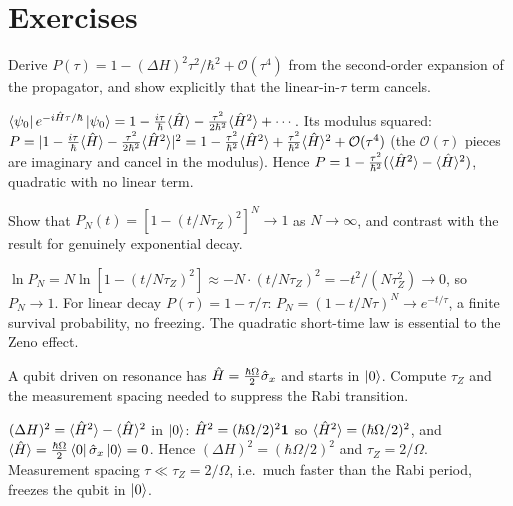 \section*{Exercises}

\begin{exercise}
Derive $P(\tau)=1-(\Delta H)^2\tau^2/\hbar^2+\mathcal O(\tau^4)$ from
the second-order expansion of the propagator, and show explicitly
that the linear-in-$\tau$ term cancels.
\begin{solution}
$\bra{\psi_0}e^{-i\hat{H}\tau/\hbar}\ket{\psi_0}
=1-\tfrac{i\tau}{\hbar}\langle\hat{H}\rangle-\tfrac{\tau^2}{2\hbar^2}\langle\hat{H}^2\rangle+\cdots$.
Its modulus squared:
$P=|1-\tfrac{i\tau}\hbar\langle\hat{H}\rangle-\tfrac{\tau^2}{2\hbar^2}\langle\hat{H}^2\rangle|^2
=1-\tfrac{\tau^2}{\hbar^2}\langle\hat{H}^2\rangle+\tfrac{\tau^2}{\hbar^2}\langle\hat{H}\rangle^2+\mathcal O(\tau^4)$
(the $\mathcal O(\tau)$ pieces are imaginary and cancel in the
modulus). Hence $P=1-\tfrac{\tau^2}{\hbar^2}(\langle\hat{H}^2\rangle-\langle\hat{H}\rangle^2)$,
quadratic with no linear term.
\end{solution}
\end{exercise}

\begin{exercise}
Show that $P_N(t)=[1-(t/N\tau_Z)^2]^N\to1$ as $N\to\infty$, and
contrast with the result for genuinely exponential decay.
\begin{solution}
$\ln P_N=N\ln[1-(t/N\tau_Z)^2]\approx -N\cdot(t/N\tau_Z)^2=-t^2/(N\tau_Z^2)\to0$,
so $P_N\to1$. For linear decay $P(\tau)=1-\tau/\tau$:
$P_N=(1-t/N\tau)^N\to e^{-t/\tau}$, a finite survival probability,
no freezing. The quadratic short-time law is essential to the Zeno
effect.
\end{solution}
\end{exercise}

\begin{exercise}
A qubit driven on resonance has $\hat{H}=\tfrac{\hbar\Omega}{2}\hat\sigma_x$
and starts in $\ket0$. Compute $\tau_Z$ and the measurement spacing
needed to suppress the Rabi transition.
\begin{solution}
$(\Delta H)^2=\langle\hat{H}^2\rangle-\langle\hat{H}\rangle^2$ in
$\ket0$: $\hat{H}^2=(\hbar\Omega/2)^2\mathbf{1}$ so $\langle\hat{H}^2\rangle=(\hbar\Omega/2)^2$,
and $\langle\hat{H}\rangle=\tfrac{\hbar\Omega}{2}\bra0\hat\sigma_x\ket0=0$.
Hence $(\Delta H)^2=(\hbar\Omega/2)^2$ and $\tau_Z=2/\Omega$.
Measurement spacing $\tau\ll\tau_Z=2/\Omega$, i.e.\ much faster than
the Rabi period, freezes the qubit in $\ket0$.
\end{solution}
\end{exercise}

